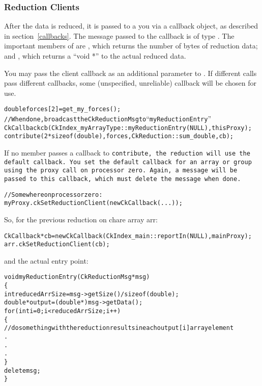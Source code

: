 \subsubsection{Reduction Clients}
\label{reductionClients}

After the data is reduced, it is passed to a you via a callback object,
as described in section~\ref{callbacks}.  The message passed to
the callback is of type .
The important members of  are
, which returns the number of bytes of reduction data; and
, which returns a ``void *'' to the actual reduced data.

You may pass the client callback as an additional parameter to .
If different  calls pass different callbacks, some (unspecified,
unreliable) callback will be chosen for use.
\begin{alltt}
    double forces[2]=get_my_forces();
    //When done, broadcast the CkReductionMsg to ``myReductionEntry''
    CkCallback cb(CkIndex_myArrayType::myReductionEntry(NULL), thisProxy);
    contribute(2*sizeof(double), forces,CkReduction::sum_double, cb);
\end{alltt}

If no member passes a callback to \tt{contribute}, the reduction will use
the default callback. You set the default callback for an array or group
using the  proxy call on processor zero.
Again, a  message will be passed to this callback,
which must delete the message when done.

\begin{alltt}
    //Somewhere on processor zero:
    myProxy.ckSetReductionClient(new CkCallback(...));
\end{alltt}

So, for the previous reduction on chare array arr:
\begin{alltt}
    CkCallback *cb = new CkCallback(CkIndex_main::reportIn(NULL),  mainProxy);
    arr.ckSetReductionClient(cb);
\end{alltt}

and the actual entry point:

\begin{alltt}
void myReductionEntry(CkReductionMsg *msg)
\{
  int reducedArrSize=msg->getSize() / sizeof(double);
  double *output=(double *) msg->getData();
  for(int i=0 ; i<reducedArrSize ; i++)
  \{
   // do something with the reduction results in each output[i] array element
   .
   .
   .
  \}
  delete msg;
\}
\end{alltt}

